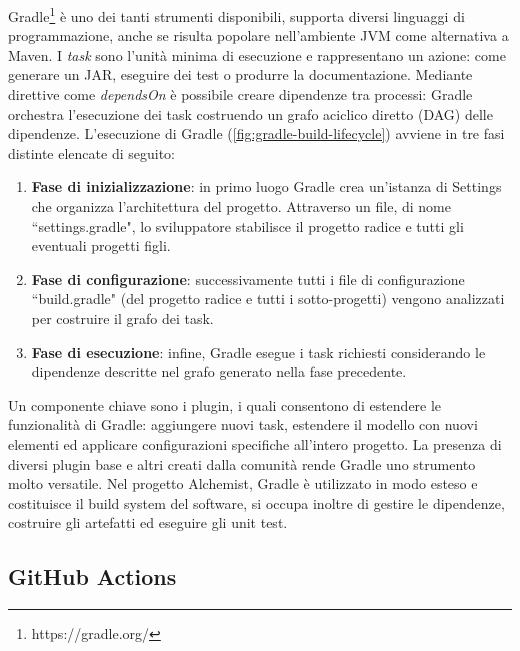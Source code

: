 Gradle\footnote{https://gradle.org/} è uno dei tanti strumenti disponibili, supporta diversi linguaggi di programmazione, anche se risulta popolare nell'ambiente JVM come alternativa a Maven. I \textit{task} sono l'unità minima di esecuzione e rappresentano un azione: come generare un JAR, eseguire dei test o produrre la documentazione. Mediante direttive come \textit{dependsOn} è possibile creare dipendenze tra processi: Gradle orchestra l'esecuzione dei task costruendo un grafo aciclico diretto (DAG) delle dipendenze. L'esecuzione di Gradle (\cref{fig:gradle-build-lifecycle}) avviene in tre fasi distinte elencate di seguito:


\begin{enumerate}
	\item \textbf{Fase di inizializzazione}: in primo luogo Gradle crea un'istanza di Settings che organizza l'architettura del progetto. Attraverso un file, di nome ``settings.gradle", lo sviluppatore stabilisce il progetto radice e tutti gli eventuali progetti figli. 
	\item \textbf{Fase di configurazione}: successivamente tutti i file di configurazione ``build\-.\-gradle" (del progetto radice e tutti i sotto-progetti) vengono analizzati per costruire il grafo dei task.
	\item \textbf{Fase di esecuzione}: infine, Gradle esegue i task richiesti considerando le dipendenze descritte nel grafo generato nella fase precedente.
\end{enumerate}

Un componente chiave sono i plugin, i quali consentono di estendere le funzionalità di Gradle: aggiungere nuovi task, estendere il modello con nuovi elementi ed applicare configurazioni specifiche all'intero progetto. La presenza di diversi plugin base e altri creati dalla comunità rende Gradle uno strumento molto versatile. Nel progetto Alchemist, Gradle è utilizzato in modo esteso e costituisce il build system del software, si occupa inoltre di gestire le dipendenze, costruire gli artefatti ed eseguire gli unit test.

\subsection{GitHub Actions}

